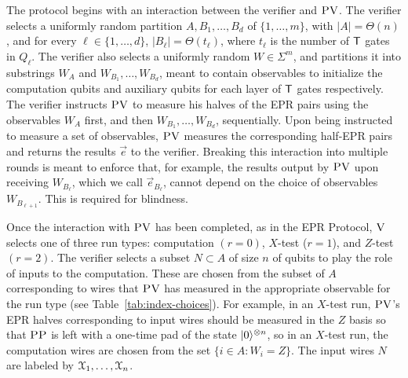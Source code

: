 The protocol begins with an interaction between the verifier and $\textsc{PV}$. The verifier selects a uniformly random partition $A,B_1,\dots,B_d$ of $\{1,\dots,m\}$, with $|A|=\Theta(n)$, and for every $\ell\in\{1,\dots,d\}$, $|B_{\ell}|=\Theta(t_\ell)$, where $t_{\ell}$ is the number of $\sf T$ gates in $Q_\ell$. The verifier also selects a uniformly random $W\in\Sigma^m$, and partitions it into substrings $W_A$ and $W_{B_1},\ldots,W_{B_d}$, meant to contain observables to initialize the computation qubits and auxiliary qubits for each layer of ${\sf T}$ gates respectively. The verifier instructs $\textsc{PV}$ to measure his halves of the EPR pairs using the observables $W_A$ first, and then $W_{B_1},\ldots,W_{B_d}$, sequentially. Upon being instructed to measure a set of observables, $\textsc{PV}$ measures the corresponding half-EPR pairs and returns the results $\vec{e}$ to the verifier. Breaking this interaction into multiple rounds is meant to enforce that, for example, the results output by $\textsc{PV}$ upon receiving $W_{B_{\ell}}$, which we call $\vec{e}_{B_{\ell}}$, cannot depend on the choice of observables $W_{B_{\ell+1}}$. This is required for blindness. 

Once the interaction with $\textsc{PV}$ has been completed, as in the EPR Protocol, $\textsc{V}$ selects one of three run types: computation $(r=0)$, $X$-test ($r=1$), and $Z$-test $(r=2)$. 
The verifier selects a subset $N\subset A$ of size $n$ of qubits to play the role of inputs to the computation. These are chosen from the subset of $A$ corresponding to wires that $\textsc{PV}$ has measured in the appropriate observable for the run type (see Table~\ref{tab:index-choices}). For example, in an $X$-test run, $\textsc{PV}$'s EPR halves corresponding to input wires should be measured in the $Z$ basis so that $\textsc{PP}$ is left with a one-time pad of the state $|0\rangle^{\otimes n}$, so in an $X$-test run, the computation wires are chosen from the set $\{i\in A:W_i=Z\}$. The input wires $N$ are labeled by ${\cal X}_1,\dots,{\cal X}_n$. 




